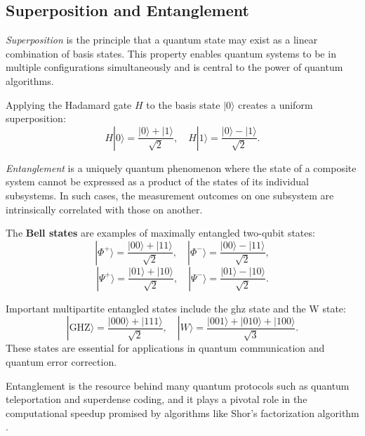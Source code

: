 
\subsection{Superposition and Entanglement}
\label{subsec:superposition}

\begin{definition}[Superposition]
\emph{Superposition} is the principle that a quantum state may exist as a linear combination of basis states. This property enables quantum systems to be in multiple configurations simultaneously and is central to the power of quantum algorithms.
\end{definition}

\begin{example}
Applying the Hadamard gate \(H\) to the basis state \(|0\rangle\) creates a uniform superposition:
\[
H|0\rangle = \frac{|0\rangle + |1\rangle}{\sqrt{2}}, \quad H|1\rangle = \frac{|0\rangle - |1\rangle}{\sqrt{2}}.
\]
\end{example}

\begin{definition}[Entanglement]
\emph{Entanglement} is a uniquely quantum phenomenon where the state of a composite system cannot be expressed as a product of the states of its individual subsystems. In such cases, the measurement outcomes on one subsystem are intrinsically correlated with those on another.
\end{definition}

\begin{example}
The \textbf{Bell states} are examples of maximally entangled two-qubit states:
\[
|\Phi^+\rangle = \frac{|00\rangle + |11\rangle}{\sqrt{2}}, \quad
|\Phi^-\rangle = \frac{|00\rangle - |11\rangle}{\sqrt{2}},
\]
\[
|\Psi^+\rangle = \frac{|01\rangle + |10\rangle}{\sqrt{2}}, \quad
|\Psi^-\rangle = \frac{|01\rangle - |10\rangle}{\sqrt{2}}.
\]
\end{example}

\begin{example}
Important multipartite entangled states include the \gls{ghz} state and the W state:
\[
|\text{GHZ}\rangle = \frac{|000\rangle + |111\rangle}{\sqrt{2}}, \quad
|W\rangle = \frac{|001\rangle + |010\rangle + |100\rangle}{\sqrt{3}}.
\]
These states are essential for applications in quantum communication and quantum error correction.
\end{example}

\begin{observation}
Entanglement is the resource behind many quantum protocols such as quantum teleportation \cite{bennett1993teleporting} and superdense coding, and it plays a pivotal role in the computational speedup promised by algorithms like Shor's factorization algorithm \cite{shor1999polynomial}.
\end{observation}
